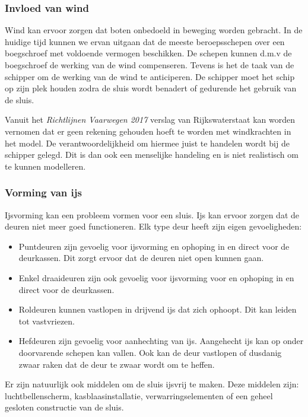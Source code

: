 \documentclass{article}
\begin{document}

\subsubsection{Invloed van wind} %
Wind kan ervoor zorgen dat boten onbedoeld in beweging worden gebracht. In de huidige tijd kunnen we ervan uitgaan dat de meeste beroepsschepen over een boegschroef  met voldoende vermogen beschikken. De schepen kunnen d.m.v de boegschroef de werking van de wind compenseren. Tevens is het de taak van de schipper om de werking van de wind te anticiperen. De schipper moet het schip op zijn plek houden zodra de sluis wordt benadert of gedurende het gebruik van de sluis.

Vanuit het \textit{Richtlijnen Vaarwegen 2017} verslag van Rijkswaterstaat \cite{rijkswaterstaat2017} kan worden vernomen dat er geen rekening gehouden hoeft te worden met windkrachten in het model. De verantwoordelijkheid om hiermee juist te handelen wordt bij de schipper gelegd. Dit is dan ook een menselijke handeling en is niet realistisch om te kunnen modelleren.

\vskip0.5cm

\subsubsection{Vorming van ijs}
Ijsvorming kan een probleem vormen voor een sluis. Ijs kan ervoor zorgen dat de deuren niet meer goed functioneren. Elk type deur heeft zijn eigen gevoeligheden:
\begin{itemize}
\item Puntdeuren zijn gevoelig voor ijsvorming en ophoping in en direct voor de deurkassen. Dit zorgt ervoor dat de deuren niet open kunnen gaan.
\item Enkel draaideuren zijn ook gevoelig voor ijsvorming voor en ophoping in en direct voor de deurkassen.
\item Roldeuren kunnen vastlopen in drijvend ijs dat zich ophoopt. Dit kan leiden tot vastvriezen.
\item Hefdeuren zijn gevoelig voor aanhechting van ijs. Aangehecht ijs kan op onder doorvarende schepen kan vallen. Ook kan de deur vastlopen of dusdanig zwaar raken dat de deur te zwaar wordt om te heffen.
\end{itemize}

Er zijn natuurlijk ook middelen om de sluis ijsvrij te maken. Deze middelen zijn: luchtbellenscherm, kasblaasinstallatie, verwarringselementen of een geheel gesloten constructie van de sluis.
\end{document}
